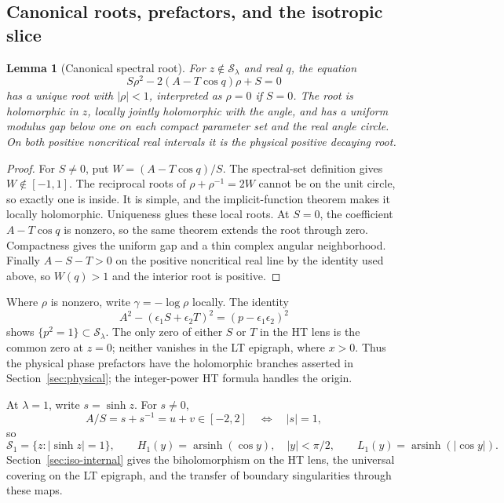 \documentclass[11pt]{article}
\numberwithin{equation}{section}
\newtheorem{lemma}[theorem]{Lemma}
\theoremstyle{definition}
\newcommand{\cS}{\mathcal S}
\begin{document}
\subsection{Canonical roots, prefactors, and the isotropic slice}

\begin{lemma}[Canonical spectral root]\label{lem:canonicalroot}
For $z\notin\cS_\lambda$ and real $q$, the equation
\[
 S\rho^2-2(A-T\cos q)\rho+S=0
\]
has a unique root with $|\rho|<1$, interpreted as $\rho=0$ if
$S=0$.  The root is holomorphic in $z$, locally jointly
holomorphic with the angle, and has a uniform modulus gap below
one on each compact parameter set and the real angle circle.
On both positive noncritical real intervals it is the physical
positive decaying root.
\end{lemma}
\begin{proof}
For $S\ne0$, put $W=(A-T\cos q)/S$.  The spectral-set definition
gives $W\notin[-1,1]$.  The reciprocal roots of
$\rho+\rho^{-1}=2W$ cannot be on the unit circle, so exactly one
is inside.  It is simple, and the implicit-function theorem makes
it locally holomorphic.  Uniqueness glues these local roots.
At $S=0$, the coefficient $A-T\cos q$ is nonzero, so the same
theorem extends the root through zero.  Compactness gives the
uniform gap and a thin complex angular neighborhood.  Finally
$A-S-T>0$ on the positive noncritical real line by the identity
used above, so $W(q)>1$ and the interior root is positive.
\end{proof}

Where $\rho$ is nonzero, write $\gamma=-\log\rho$ locally.
The identity
\[
 A^2-(\epsilon_1S+\epsilon_2T)^2=(p-\epsilon_1\epsilon_2)^2
\]
shows $\{p^2=1\}\subset\cS_\lambda$.
The only zero of either $S$ or $T$ in the HT lens is the common
zero at $z=0$; neither vanishes in the LT epigraph, where $x>0$.
Thus the physical phase prefactors have the holomorphic branches
asserted in Section~\ref{sec:physical}; the integer-power HT
formula handles the origin.

At $\lambda=1$, write $s=\sinh z$.  For $s\ne0$,
\[
 A/S=s+s^{-1}=u+v\in[-2,2]
 \quad\Longleftrightarrow\quad |s|=1,
\]
so
\begin{equation}\label{eq:isotropicgeometry}
 \cS_1=\{z:|\sinh z|=1\},\qquad
 H_1(y)=\operatorname{arsinh}(\cos y),\quad |y|<\pi/2,
 \qquad L_1(y)=\operatorname{arsinh}(|\cos y|).
\end{equation}
Section~\ref{sec:iso-internal} gives the biholomorphism on the HT lens,
the universal covering on the LT epigraph, and the transfer of
boundary singularities through these maps.
\end{document}
